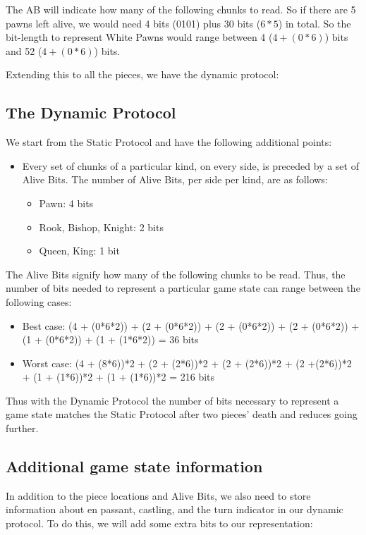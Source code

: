 \documentclass[journal]{journal}
\begin{document}
The AB will indicate how many of the following chunks to read. So if there are 5 pawns left alive, we would need 4 bits (0101) plus 30 bits ($6*5$) in total. So the bit-length to represent White Pawns would range between 4 ($4+(0*6)$) bits and 52 ($4+(0*6)$) bits.

Extending this to all the pieces, we have the dynamic protocol:
\newpage

\subsection{The Dynamic Protocol}
We start from the Static Protocol and have the following additional points:

\begin{itemize}
    \item Every set of chunks of a particular kind, on every side, is preceded by a set of Alive Bits. The number of Alive Bits, per side per kind, are as follows:
    \begin{itemize}
        \item Pawn: 4 bits
        \item Rook, Bishop, Knight: 2 bits
        \item Queen, King: 1 bit
    \end{itemize}
\end{itemize}

The Alive Bits signify how many of the following chunks to be read. Thus, the number of bits needed to represent a particular game state can range between the following cases:
\begin{itemize}
    \item Best case: (4 + (0*6*2)) + (2 + (0*6*2)) + (2 + (0*6*2)) + (2 + (0*6*2)) + (1 + (0*6*2)) + (1 + (1*6*2)) = 36 bits
    \item Worst case: (4 + (8*6))*2 + (2 + (2*6))*2 + (2 + (2*6))*2 + (2 +(2*6))*2 + (1 + (1*6))*2 + (1 + (1*6))*2 = 216 bits
\end{itemize}

Thus with the Dynamic Protocol the number of bits necessary to represent a game state matches the Static Protocol after two pieces' death and reduces going further.

\subsection{Additional game state information}  
   
In addition to the piece locations and Alive Bits, we also need to store information about en passant, castling, and the turn indicator in our dynamic protocol. To do this, we will add some extra bits to our representation:  
   
\end{document}

